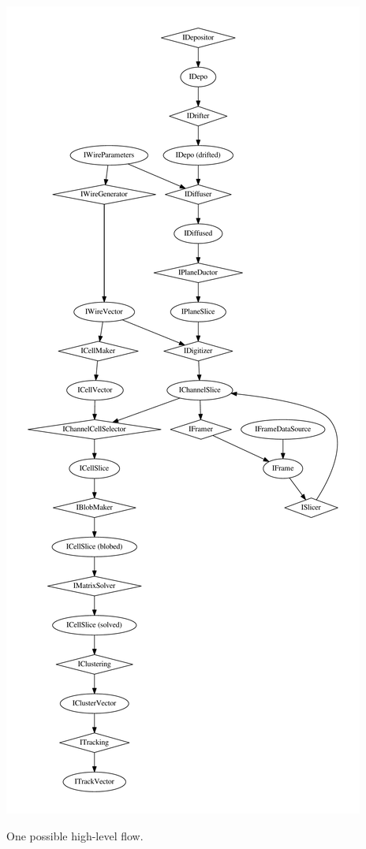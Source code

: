 \documentclass[xcolor=dvipsnames]{beamer}
\begin{document}
\begin{frame}[fragile]
\begin{columns}
\begin{column}{0.3\textwidth}
        \includegraphics[width=\textwidth]{dataflow.pdf}

        \tiny One possible high-level flow.
      \end{column}
    \end{columns}
\end{frame}
\end{document}

